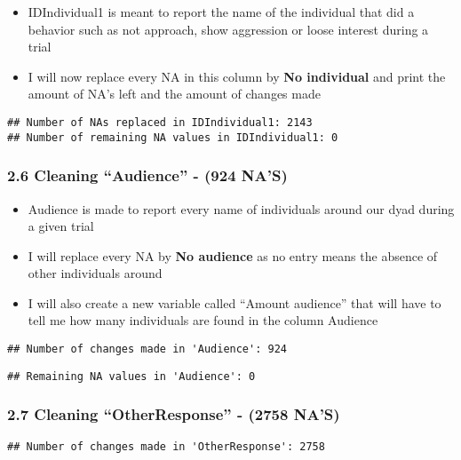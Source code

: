 \documentclass[
]{article}
\providecommand{\tightlist}{%
  \setlength{\itemsep}{0pt}\setlength{\parskip}{0pt}}
\begin{document}
\begin{itemize}
\tightlist
\item
  IDIndividual1 is meant to report the name of the individual that did a
  behavior such as not approach, show aggression or loose interest
  during a trial
\item
  I will now replace every NA in this column by \textbf{No individual}
  and print the amount of NA's left and the amount of changes made
\end{itemize}

\begin{verbatim}
## Number of NAs replaced in IDIndividual1: 2143 
## Number of remaining NA values in IDIndividual1: 0
\end{verbatim}

\hypertarget{cleaning-audience---924-nas}{%
\subsubsection{2.6 Cleaning ``Audience'' - (924
NA'S)}\label{cleaning-audience---924-nas}}

\begin{itemize}
\tightlist
\item
  Audience is made to report every name of individuals around our dyad
  during a given trial
\item
  I will replace every NA by \textbf{No audience} as no entry means the
  absence of other individuals around
\item
  I will also create a new variable called ``Amount audience'' that will
  have to tell me how many individuals are found in the column Audience
\end{itemize}

\begin{verbatim}
## Number of changes made in 'Audience': 924
\end{verbatim}

\begin{verbatim}
## Remaining NA values in 'Audience': 0
\end{verbatim}

\hypertarget{cleaning-otherresponse---2758-nas}{%
\subsubsection{2.7 Cleaning ``OtherResponse'' - (2758
NA'S)}\label{cleaning-otherresponse---2758-nas}}

\begin{verbatim}
## Number of changes made in 'OtherResponse': 2758
\end{verbatim}
\end{document}
